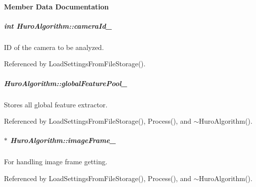 \paragraph{Member Data Documentation}
\hypertarget{group___object_recognition_ab1c035063117de9d0b865066d877e11a}{
\subparagraph[{camera\-Id\-\_\-}]{\setlength{\rightskip}{0pt plus 5cm}int Huro\-Algorithm\-::camera\-Id\-\_\-\hspace{0.3cm}{\ttfamily [private]}}}\label{group___object_recognition_ab1c035063117de9d0b865066d877e11a}


I\-D of the camera to be analyzed. 



Referenced by Load\-Settings\-From\-File\-Storage().

\hypertarget{group___object_recognition_a764b3c6f64d2cbcc7062359593c097d4}{
\subparagraph[{global\-Feature\-Pool\-\_\-}]{ Huro\-Algorithm\-::global\-Feature\-Pool\-\_\-\hspace{0.3cm}{\ttfamily [private]}}}\label{group___object_recognition_a764b3c6f64d2cbcc7062359593c097d4}


Stores all global feature extractor. 



Referenced by Load\-Settings\-From\-File\-Storage(), Process(), and $\sim$\-Huro\-Algorithm().

\hypertarget{group___object_recognition_ae03bda7ba79c469b7f36566fe354f93a}{
\subparagraph[{image\-Frame\-\_\-}]{$\ast$ Huro\-Algorithm\-::image\-Frame\-\_\-\hspace{0.3cm}{\ttfamily [private]}}}\label{group___object_recognition_ae03bda7ba79c469b7f36566fe354f93a}


For handling image frame getting. 



Referenced by Load\-Settings\-From\-File\-Storage(), Process(), and $\sim$\-Huro\-Algorithm().

